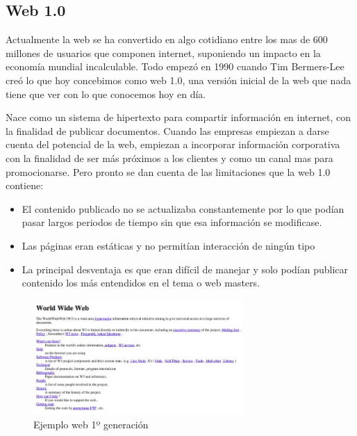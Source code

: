 \subsection*{Web 1.0}
Actualmente la web se ha convertido en algo cotidiano entre los mas de 600 millones de usuarios que componen internet, suponiendo un impacto en la economía mundial incalculable. Todo empezó en 1990 cuando Tim Bermers-Lee creó lo que hoy concebimos como web 1.0, una versión inicial de la web que nada tiene que ver con lo que conocemos hoy en día. 

Nace como un sistema de hipertexto para compartir información en internet, con la finalidad de publicar documentos. Cuando las empresas empiezan a darse cuenta del potencial de la web, empiezan a incorporar información corporativa con la finalidad de ser más próximos a los clientes y como un canal mas para promocionarse. Pero pronto se dan cuenta de las limitaciones que la web 1.0 contiene:

\begin{itemize}

    \item El contenido publicado no se actualizaba constantemente por lo que podían pasar largos periodos de tiempo sin que esa información se modificase.

    \item Las páginas eran estáticas y no permitían interacción de ningún tipo

    \item La principal desventaja es que eran difícil de manejar y solo podían publicar contenido los más entendidos en el tema o web masters.
 
\end{itemize}


\begin{figure}[H]
    \centering
    \includegraphics[width=80mm]{memoria/LaTeX/img/introduccion/web1.jpg}
    \caption[Ejemplo web 1º generación]{Ejemplo web 1º generación}
\end{figure}

